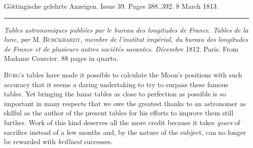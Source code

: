 \clearpage
{}
\begin{center}\small Göttingische gelehrte Anzeigen. Issue 39. Pages 388..392. 8 March 1813.\\[3pt]\rule{.72\linewidth}{.3pt}\end{center}

\emph{Tables astronomiques publiées par le bureau des longitudes de France. Tables de la lune, par} M. \textsc{Burckhardt}, \emph{membre de l'institut impérial, du bureau des longitudes de France et de plusieurs autres sociétés savantes. Décembre} 1812. Paris. From Madame Courcier. 88 pages in quarto.

\textsc{Bürg}'s tables have made it possible to calculate the Moon's positions with such accuracy that it seems a daring undertaking to try to surpass these famous tables. Yet bringing the lunar tables as close to perfection as possible is so important in many respects that we owe the greatest thanks to an astronomer as skilful as the author of the present tables for his efforts to improve them still further. Work of this kind deserves all the more credit because it takes \emph{years} of sacrifice instead of a few months and, by the nature of the subject, can no longer be rewarded with \emph{brilliant} successes.

